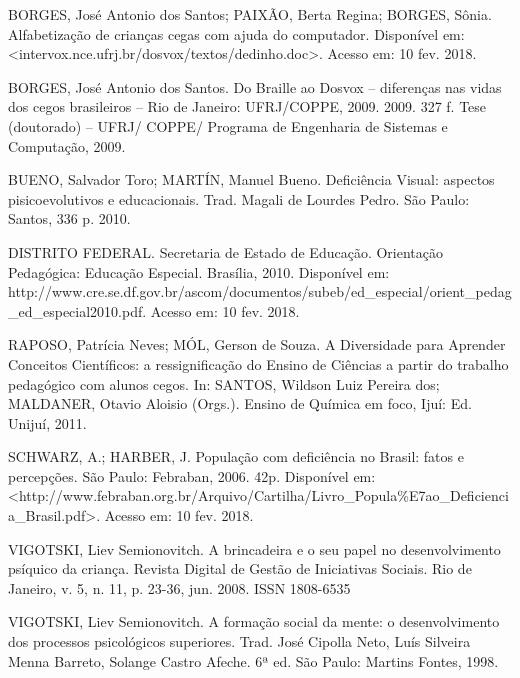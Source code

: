 	\begin{thebibliography}{999}
	\bibitem{} BORGES, José Antonio dos Santos; PAIXÃO, Berta Regina; BORGES, Sônia. Alfabetização de crianças cegas com ajuda do computador. Disponível em: <intervox.nce.ufrj.br/dosvox/textos/dedinho.doc>. Acesso em: 10 fev. 2018.

	\bibitem{} BORGES, José Antonio dos Santos. Do Braille ao Dosvox – diferenças nas vidas dos cegos brasileiros – Rio de Janeiro: UFRJ/COPPE, 2009. 2009. 327 f. Tese (doutorado) – UFRJ/ COPPE/ Programa de Engenharia de Sistemas e Computação, 2009.
	
    \bibitem{} BUENO, Salvador Toro; MARTÍN, Manuel Bueno. Deficiência Visual: aspectos pisicoevolutivos e educacionais. Trad. Magali de Lourdes Pedro. São Paulo: Santos, 336 p. 2010.

	\bibitem{} DISTRITO FEDERAL.  Secretaria de Estado de Educação. Orientação Pedagógica: Educação Especial. Brasília, 2010. Disponível em: http://www.cre.se.df.gov.br/ascom/documentos/subeb/ed\_especial/orient\_pedag\_ed\_especial2010.pdf. Acesso em: 10 fev. 2018.

	\bibitem{} RAPOSO, Patrícia Neves; MÓL, Gerson de Souza. A Diversidade para Aprender Conceitos Científicos: a ressignificação do Ensino de Ciências a partir do trabalho pedagógico com alunos cegos. In: SANTOS, Wildson Luiz Pereira dos; MALDANER, Otavio Aloisio (Orgs.). Ensino de Química em foco, Ijuí: Ed. Unijuí, 2011.

	\bibitem{} SCHWARZ, A.; HARBER, J. População com deficiência no Brasil: fatos e percepções. São Paulo: Febraban, 2006. 42p. Disponível em: <http://www.febraban.org.br/Arquivo/Cartilha/Livro\_Popula\%E7ao\_Deficiencia\_Brasil.pdf>. Acesso em: 10 fev. 2018.

	\bibitem{} VIGOTSKI, Liev Semionovitch. A brincadeira e o seu papel no desenvolvimento psíquico da criança. Revista Digital de Gestão de Iniciativas Sociais. Rio de Janeiro, v. 5, n. 11, p. 23-36, jun. 2008. ISSN 1808-6535

	\bibitem{} VIGOTSKI, Liev Semionovitch. A formação social da mente: o desenvolvimento dos processos psicológicos superiores. Trad. José Cipolla Neto, Luís Silveira Menna Barreto, Solange Castro Afeche. 6ª ed. São Paulo: Martins Fontes, 1998.

	\end{thebibliography}

\vspace{24pt}


\clearpage	